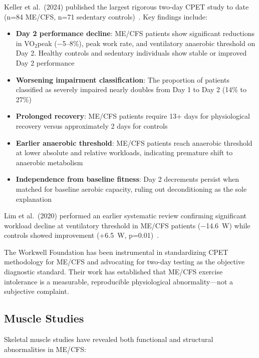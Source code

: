 Keller et al.\ (2024) published the largest rigorous two-day CPET study to date (n=84 ME/CFS, n=71 sedentary controls)~\cite{keller2024cpet}. Key findings include:

\begin{itemize}
    \item \textbf{Day 2 performance decline}: ME/CFS patients show significant reductions in VO$_2$peak ($-$5--8\%), peak work rate, and ventilatory anaerobic threshold on Day 2. Healthy controls and sedentary individuals show stable or improved Day 2 performance
    \item \textbf{Worsening impairment classification}: The proportion of patients classified as severely impaired nearly doubles from Day 1 to Day 2 (14\% to 27\%)
    \item \textbf{Prolonged recovery}: ME/CFS patients require 13+ days for physiological recovery versus approximately 2 days for controls
    \item \textbf{Earlier anaerobic threshold}: ME/CFS patients reach anaerobic threshold at lower absolute and relative workloads, indicating premature shift to anaerobic metabolism
    \item \textbf{Independence from baseline fitness}: Day 2 decrements persist when matched for baseline aerobic capacity, ruling out deconditioning as the sole explanation
\end{itemize}

Lim et al.\ (2020) performed an earlier systematic review confirming significant workload decline at ventilatory threshold in ME/CFS patients ($-$14.6~W) while controls showed improvement (+6.5~W, p=0.01)~\cite{Lim2020}.

The Workwell Foundation has been instrumental in standardizing CPET methodology for ME/CFS and advocating for two-day testing as the objective diagnostic standard. Their work has established that ME/CFS exercise intolerance is a measurable, reproducible physiological abnormality---not a subjective complaint.

\subsection{Muscle Studies}

Skeletal muscle studies have revealed both functional and structural abnormalities in ME/CFS:

